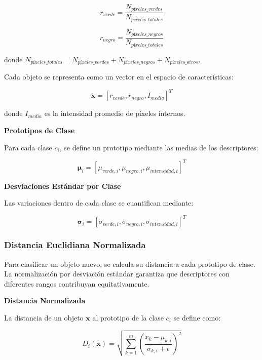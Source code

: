 \begin{equation}
r_{verde} = \frac{N_{píxeles\_verdes}}{N_{píxeles\_totales}}
\end{equation}

\begin{equation}
r_{negro} = \frac{N_{píxeles\_negros}}{N_{píxeles\_totales}}
\end{equation}

donde $N_{píxeles\_totales} = N_{píxeles\_verdes} + N_{píxeles\_negros} + N_{píxeles\_otros}$.

Cada objeto se representa como un vector en el espacio de características:

\begin{equation}
\mathbf{x} = [r_{verde}, r_{negro}, I_{media}]^T
\end{equation}

donde $I_{media}$ es la intensidad promedio de píxeles internos.

\textbf{Prototipos de Clase}

Para cada clase $c_i$, se define un prototipo mediante las medias de los descriptores:

\begin{equation}
\boldsymbol{\mu}_i = [\mu_{verde,i}, \mu_{negro,i}, \mu_{intensidad,i}]^T
\end{equation}

\textbf{Desviaciones Estándar por Clase}

Las variaciones dentro de cada clase se cuantifican mediante:

\begin{equation}
\boldsymbol{\sigma}_i = [\sigma_{verde,i}, \sigma_{negro,i}, \sigma_{intensidad,i}]^T
\end{equation}

\subsubsection{Distancia Euclidiana Normalizada}

Para clasificar un objeto nuevo, se calcula su distancia a cada prototipo de clase. La normalización por desviación estándar garantiza que descriptores con diferentes rangos contribuyan equitativamente.

\textbf{Distancia Normalizada}

La distancia de un objeto $\mathbf{x}$ al prototipo de la clase $c_i$ se define como:

\begin{equation}
D_i(\mathbf{x}) = \sqrt{\sum_{k=1}^{m} \left(\frac{x_k - \mu_{k,i}}{\sigma_{k,i} + \epsilon}\right)^2}
\end{equation}

